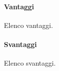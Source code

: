 \documentclass[../SpecificaTecnica.tex]{subfiles}
\begin{document}
			\paragraph{Vantaggi}
				Elenco vantaggi.
			\paragraph{Svantaggi}
				Elenco svantaggi.
\end{document}
